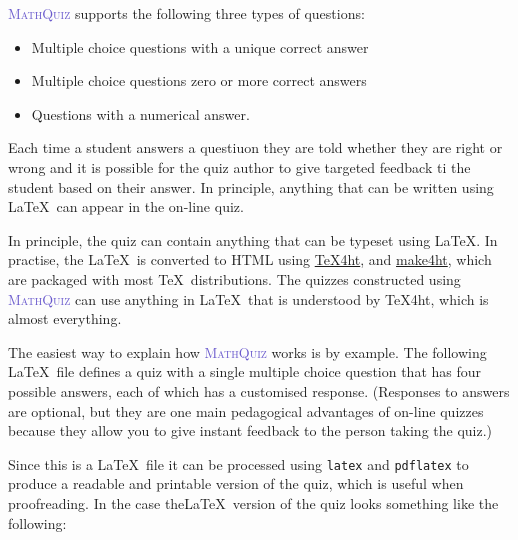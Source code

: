 \documentclass[svgnames]{article}
\def\MathQuiz{\textcolor{SlateBlue}{\textsc{MathQuiz}}\xspace}
\begin{document}
    \MathQuiz supports the following three types of questions:
    \begin{itemize}
      \item Multiple choice questions with a unique correct answer
      \item Multiple choice questions zero or more correct answers
      \item Questions with a numerical answer.
    \end{itemize}
    Each time a student answers a questiuon they are told whether they
    are right or wrong and it is possible for the quiz author to give
    targeted feedback ti the student based on their answer. In
    principle, anything that can be written using \LaTeX\ can appear in
    the on-line quiz.

    In principle, the quiz can contain anything that can be typeset
    using \LaTeX.  In practise, the \LaTeX\ is converted to HTML using
    \href{https://www.tug.org/applications/tex4ht/mn.html}{\TeX 4ht},
    and \href{https://github.com/michal-h21/make4ht}{make4ht}, which are
    packaged with most \TeX\ distributions. The quizzes constructed
    using \MathQuiz can use anything in \LaTeX\ that is understood by
    \TeX 4ht, which is almost everything.

    The easiest way to explain how \MathQuiz works is by example. The
    following \LaTeX\ file defines a quiz with a single multiple choice
    question that has four possible answers, each of which has a
    customised response.  (Responses to answers are optional, but they
    are one main pedagogical advantages of on-line quizzes because they
    allow you to give instant feedback to the person taking the quiz.)

    

    Since this is a \LaTeX\ file it can be processed using
    \texttt{latex} and \texttt{pdflatex} to produce a readable and
    printable version of the quiz, which is useful when proofreading. In
    the case the\LaTeX\ version of the quiz looks something like the
    following:

    \begin{center}
    \end{center}
\end{document}

